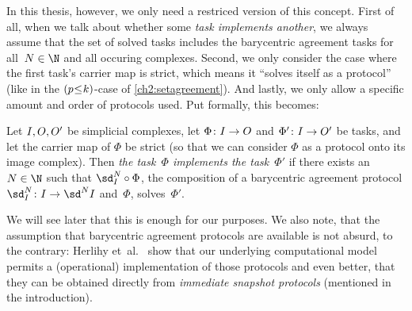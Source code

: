 In this thesis, however, we only need a restriced version of this concept.
First of all, when we talk about whether some \emph{task implements another},
we always assume that the set of solved tasks includes the barycentric agreement
tasks  for all~$N\in\N$ and all occuring
complexes. Second, we only consider the case where the first task's carrier map
is strict, which means it \enquote{solves itself as a protocol} (like in the
$(p\mkern1mu{\leq}\mkern1muk)$-case of \cref{ch2:setagreement}). And lastly, we
only allow a specific amount and order of protocols used. Put formally, this
becomes:

\begin{thDef}
    Let $I,O,O'$ be simplicial complexes, let
    $\Phi\colon I\to O$ and $\Phi'\colon I\to O'$ be tasks, and
    let the carrier map of $\Phi$ be strict (so that we can consider $\Phi$ as a
    protocol onto its image complex). Then \emph{the task~$\Phi$ implements the
    task~$\Phi'$} if there exists an $N\in\N$ such that $\sd_{\cI}^N\after\Phi$,
    the composition of a barycentric agreement protocol
    $\sd_{\cI}^N\colon\cI\to\sd^N\cI$ and~$\Phi$, solves~$\Phi'$.
\end{thDef}

We will see later that this is enough for our purposes. We also note, that the
assumption that barycentric agreement protocols are available is not absurd, to
the contrary: Herlihy et~al.~\cite[Corollary 4.2.10]{bookc:herlihyetal13} show
that our underlying computational model permits a (operational) implementation
of those protocols and even better, that they can be obtained directly from 
\emph{immediate snapshot protocols} (mentioned in the introduction).
